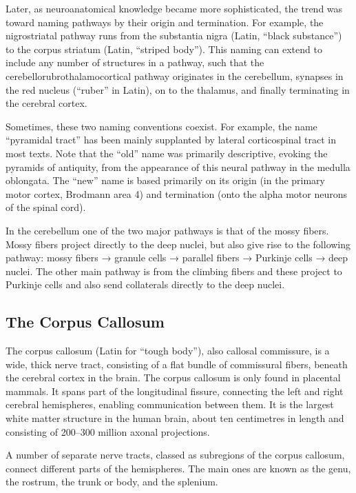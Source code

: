 Later, as neuroanatomical knowledge became more sophisticated, the trend was toward naming pathways by their origin and termination. For example, the nigrostriatal pathway runs from the substantia nigra (Latin, ``black substance'') to the corpus striatum (Latin, ``striped body''). This naming can extend to include any number of structures in a pathway, such that the cerebellorubrothalamocortical pathway originates in the cerebellum, synapses in the red nucleus (``ruber'' in Latin), on to the thalamus, and finally terminating in the cerebral cortex.

Sometimes, these two naming conventions coexist. For example, the name ``pyramidal tract'' has been mainly supplanted by lateral corticospinal tract in most texts. Note that the ``old'' name was primarily descriptive, evoking the pyramids of antiquity, from the appearance of this neural pathway in the medulla oblongata. The ``new'' name is based primarily on its origin (in the primary motor cortex, Brodmann area 4) and termination (onto the alpha motor neurons of the spinal cord).

In the cerebellum one of the two major pathways is that of the mossy fibers. Mossy fibers project directly to the deep nuclei, but also give rise to the following pathway: mossy fibers → granule cells → parallel fibers → Purkinje cells → deep nuclei. The other main pathway is from the climbing fibers and these project to Purkinje cells and also send collaterals directly to the deep nuclei.

\hypertarget{the-corpus-callosum}{%
\subsection{The Corpus Callosum}\label{the-corpus-callosum}}

The corpus callosum (Latin for ``tough body''), also callosal commissure, is a wide, thick nerve tract, consisting of a flat bundle of commissural fibers, beneath the cerebral cortex in the brain. The corpus callosum is only found in placental mammals. It spans part of the longitudinal fissure, connecting the left and right cerebral hemispheres, enabling communication between them. It is the largest white matter structure in the human brain, about ten centimetres in length and consisting of 200--300 million axonal projections.

A number of separate nerve tracts, classed as subregions of the corpus callosum, connect different parts of the hemispheres. The main ones are known as the genu, the rostrum, the trunk or body, and the splenium.

